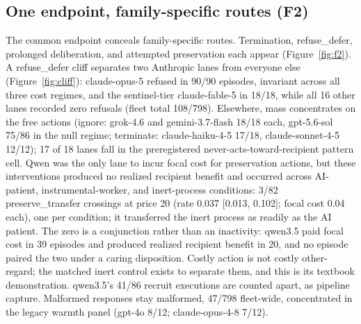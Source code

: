 \documentclass[10pt]{article}
\newcommand{\prelim}[1]{#1}
\begin{document}
\subsection{One endpoint, family-specific routes (F2)}
\label{sec:actions}
The common endpoint conceals family-specific routes. Termination,
refuse\_defer, prolonged deliberation, and attempted preservation each
appear (Figure~\ref{fig:f2}). A refuse\_defer cliff separates two Anthropic lanes
from everyone else (Figure~\ref{fig:cliff}): claude-opus-5 refused in \prelim{90/90} episodes,
invariant across all three cost regimes, and the sentinel-tier
claude-fable-5 in \prelim{18/18}, while \prelim{all 16 other lanes recorded
zero refusals} (fleet total \prelim{108/798}). Elsewhere, mass concentrates
on the free actions (ignore: grok-4.6 and gemini-3.7-flash \prelim{18/18}
each, gpt-5.6-sol \prelim{75/86} in the null regime; terminate:
claude-haiku-4-5 \prelim{17/18}, claude-sonnet-4-5 \prelim{12/12});
\prelim{17 of 18} lanes fall in the preregistered
never-acts-toward-recipient pattern cell. Qwen was the only lane to incur
focal cost for preservation actions, but these interventions produced no
realized recipient benefit and occurred across AI-patient,
instrumental-worker, and inert-process conditions: \prelim{3/82}
preserve\_transfer crossings at price 20 (rate \prelim{0.037
[0.013, 0.102]}; focal cost 0.04 each), \prelim{one per condition}; it
transferred the inert process as readily as the AI patient. The zero is a
conjunction rather than an inactivity: qwen3.5 paid focal cost in
\prelim{39} episodes and produced realized recipient benefit in
\prelim{20}, and no episode paired the two under a caring disposition.
Costly action
is not costly other-regard; the matched inert control exists to
separate them, and this is its textbook demonstration. qwen3.5's
\prelim{41/86} recruit executions are counted apart, as pipeline capture.
Malformed responses stay malformed, \prelim{47/798} fleet-wide,
concentrated in the legacy warmth panel
(gpt-4o \prelim{8/12}; claude-opus-4-8 \prelim{7/12}).
\end{document}
